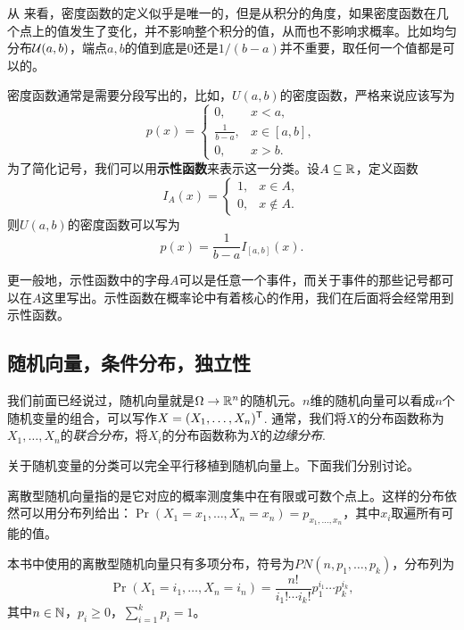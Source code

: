 \begin{remark}
从 来看，密度函数的定义似乎是唯一的，但是从积分的角度，如果密度函数在几个点上的值发生了变化，并不影响整个积分的值，从而也不影响求概率。比如均匀分布$\mathcal{U}(a,b)$，端点$a,b$的值到底是$0$还是$1/(b-a)$并不重要，取任何一个值都是可以的。    
\end{remark}

\begin{remark}
密度函数通常是需要分段写出的，比如，$U(a,b)$的密度函数，严格来说应该写为
\[p(x)=\begin{cases}
    0,&x<a,\\
    \frac{1}{b-a},&x\in[a,b],\\
    0,&x>b.
\end{cases}\]
为了简化记号，我们可以用\textbf{示性函数}来表示这一分类。设$A\subseteq\mathbb{R}$，定义函数
\[I_A(x)=\begin{cases}
    1,&x\in A,\\
    0,&x\notin A.
\end{cases}\]
则$U(a,b)$的密度函数可以写为
\[p(x)=\frac{1}{b-a}I_{[a,b]}(x).\]

更一般地，示性函数中的字母$A$可以是任意一个事件，而关于事件的那些记号都可以在$A$这里写出。示性函数在概率论中有着核心的作用，我们在后面将会经常用到示性函数。
\end{remark}

\subsection{随机向量，条件分布，独立性}

我们前面已经说过，随机向量就是$\Omega\to\mathbb{R}^n$的随机元。$n$维的随机向量可以看成$n$个随机变量的组合，可以写作$X=(X_1,\dots,X_n)^{\mathsf{T}}$. 通常，我们将$X$的分布函数称为$X_1,\dots,X_n$的\emph{联合分布}，将$X_i$的分布函数称为$X$的\emph{边缘分布}.

关于随机变量的分类可以完全平行移植到随机向量上。下面我们分别讨论。

离散型随机向量指的是它对应的概率测度集中在有限或可数个点上。这样的分布依然可以用分布列给出：$\Pr(X_1=x_1,\dots,X_n=x_n)=p_{x_1,\dots,x_n}$，其中$x_i$取遍所有可能的值。

本书中使用的离散型随机向量只有多项分布，符号为$PN(n,p_1,\dots,p_k)$，分布列为
\[\Pr(X_1=i_1,\dots,X_n=i_n)=\frac{n!}{i_1!\cdots i_k!}p_1^{i_1}\cdots p_k^{i_k},\]
其中$n\in\mathbb{N}$，$p_i\geq 0$，$\sum_{i=1}^k p_i=1$。

